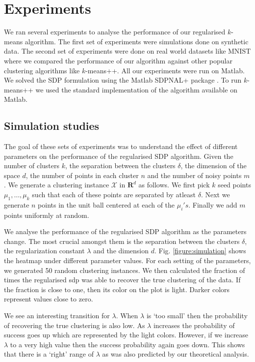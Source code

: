 \documentclass[12pt]{article}
\newcommand{\mc}{\mathcal}
\newcommand{\mb}{\mathbf}
\begin{document}
\section{Experiments}
We ran several experiments to analyse the performance of our regularised $k$-means algorithm. The first set of experiments were simulations done on synthetic data. The second set of experiments were done on real world datasets like MNIST where we compared the performance of our algorithm against other popular clustering algorithms like $k$-means++. All our experiments were run on Matlab. We solved the SDP formulation using the Matlab SDPNAL+ package \cite{yang2015sdpnal+}. To run $k$-means++ we used the standard implementation of the algorithm available on Matlab.

\subsection{Simulation studies}
The goal of these sets of experiments was to understand the effect of different parameters on the performance of the regularised SDP algorithm. Given the number of clusters $k$, the separation between the clusters $\delta$, the dimension of the space $d$, the number of points in each cluster $n$ and the number of noisy points $m$. We generate a clustering instance $\mc X$ in $\mb R^d$ as follows. We first pick $k$ seed points $\mu_1, \ldots, \mu_k$ such that each of these points are separated by atleast $\delta$. Next we generate $n$ points in the unit ball centered at each of the $\mu_i's$. Finally we add $m$ points uniformly at random. 

We analyse the performance of the regularised SDP algorithm as the parameters change. The most crucial amongst them is the separation between the clusters $\delta$, the regularization constant $\lambda$ and the dimension $d$. Fig. \ref{figure:simulation} shows the heatmap under different parameter values. For each setting of the parameters, we generated 50 random clustering instances. We then calculated the fraction of times the regularised sdp was able to recover the true clustering of the data. If the fraction is close to one, then its color on the plot is light. Darker colors represent values close to zero.

We see an interesting transition for $\lambda$. When $\lambda$ is `too small' then the probability of recovering the true clustering is also low. As $\lambda$ increases the probability of success goes up which are represented by the light colors. However, if we increase $\lambda$ to a very high value then the success probability again goes down. This shows that there is a `right' range of $\lambda$ as was also predicted by our theoretical analysis. 
\end{document}
